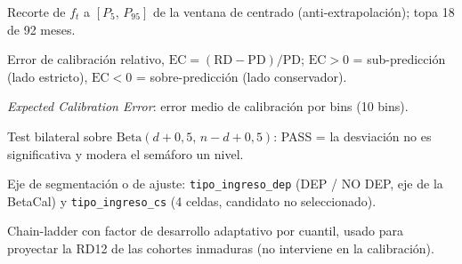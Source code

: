 \documentclass[12pt, a4paper]{article}
\newcommand{\PD}{\ensuremath{\mathrm{PD}}}
\newcommand{\RD}{\ensuremath{\mathrm{RD}}}
\newcommand{\ft}{\ensuremath{f_t}}
\newcommand{\EC}{\ensuremath{\mathrm{EC}}}
\begin{document}
\begin{description}[style=nextline, leftmargin=2.2cm]
  \item[Cap P5/P95] Recorte de $\ft$ a $[P_5,\,P_{95}]$ de la ventana de centrado (anti-extrapolación); topa 18 de 92 meses.
  \item[EC] Error de calibración relativo, $\EC=(\RD-\PD)/\PD$; $\EC>0$ = sub-predicción (lado estricto), $\EC<0$ = sobre-predicción (lado conservador).
  \item[ECE] \textit{Expected Calibration Error}: error medio de calibración por bins (10 bins).
  \item[Jeffreys] Test bilateral sobre $\mathrm{Beta}(d+0{,}5,\,n-d+0{,}5)$: PASS = la desviación no es significativa y modera el semáforo un nivel.
  \item[Driver] Eje de segmentación o de ajuste: \texttt{tipo\_ingreso\_dep} (DEP / NO DEP, eje de la BetaCal) y \texttt{tipo\_ingreso\_cs} (4 celdas, candidato no seleccionado).
  \item[V1] Chain-ladder con factor de desarrollo adaptativo por cuantil, usado para proyectar la RD12 de las cohortes inmaduras (no interviene en la calibración).
\end{description}

\newpage
\end{document}

